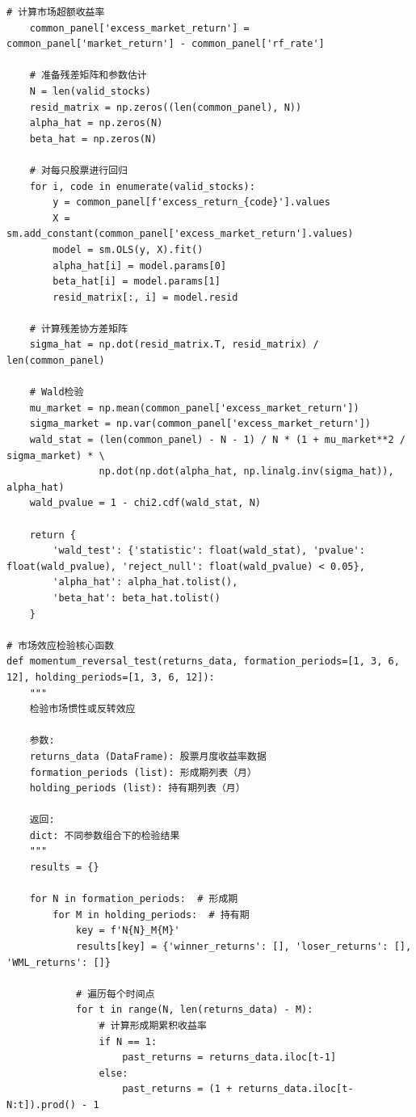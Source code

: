 \documentclass[12pt, a4paper]{article}
\begin{document}
\begin{lstlisting}[basicstyle=\small\ttfamily, breaklines=true, columns=fullflexible]
    # 计算市场超额收益率
    common_panel['excess_market_return'] = common_panel['market_return'] - common_panel['rf_rate']
    
    # 准备残差矩阵和参数估计
    N = len(valid_stocks)
    resid_matrix = np.zeros((len(common_panel), N))
    alpha_hat = np.zeros(N)
    beta_hat = np.zeros(N)
    
    # 对每只股票进行回归
    for i, code in enumerate(valid_stocks):
        y = common_panel[f'excess_return_{code}'].values
        X = sm.add_constant(common_panel['excess_market_return'].values)
        model = sm.OLS(y, X).fit()
        alpha_hat[i] = model.params[0]
        beta_hat[i] = model.params[1]
        resid_matrix[:, i] = model.resid
    
    # 计算残差协方差矩阵
    sigma_hat = np.dot(resid_matrix.T, resid_matrix) / len(common_panel)
    
    # Wald检验
    mu_market = np.mean(common_panel['excess_market_return'])
    sigma_market = np.var(common_panel['excess_market_return'])
    wald_stat = (len(common_panel) - N - 1) / N * (1 + mu_market**2 / sigma_market) * \
                np.dot(np.dot(alpha_hat, np.linalg.inv(sigma_hat)), alpha_hat)
    wald_pvalue = 1 - chi2.cdf(wald_stat, N)
    
    return {
        'wald_test': {'statistic': float(wald_stat), 'pvalue': float(wald_pvalue), 'reject_null': float(wald_pvalue) < 0.05},
        'alpha_hat': alpha_hat.tolist(),
        'beta_hat': beta_hat.tolist()
    }

# 市场效应检验核心函数
def momentum_reversal_test(returns_data, formation_periods=[1, 3, 6, 12], holding_periods=[1, 3, 6, 12]):
    """
    检验市场惯性或反转效应
    
    参数:
    returns_data (DataFrame): 股票月度收益率数据
    formation_periods (list): 形成期列表（月）
    holding_periods (list): 持有期列表（月）
    
    返回:
    dict: 不同参数组合下的检验结果
    """
    results = {}
    
    for N in formation_periods:  # 形成期
        for M in holding_periods:  # 持有期
            key = f'N{N}_M{M}'
            results[key] = {'winner_returns': [], 'loser_returns': [], 'WML_returns': []}
            
            # 遍历每个时间点
            for t in range(N, len(returns_data) - M):
                # 计算形成期累积收益率
                if N == 1:
                    past_returns = returns_data.iloc[t-1]
                else:
                    past_returns = (1 + returns_data.iloc[t-N:t]).prod() - 1
                

\end{lstlisting}
\end{document}
